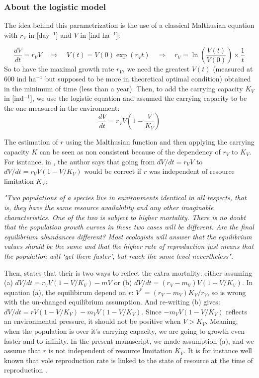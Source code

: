 \documentclass[11pt]{article}
\begin{document}
\subsubsection{About the logistic model}

The idea behind this parametrization is the use of a classical Malthusian equation with $r_V$ in [day$^{-1}$] and $V$ in [ind ha$^{-1}$]:

\begin{equation}
\frac{dV}{dt} = r_V V \quad \Rightarrow \quad
V(t) = V(0) \exp(r_V t) \quad \Rightarrow \quad
r_V = \ln\left( \frac{V(t)}{V(0)} \right) \times \frac{1}{t}
\end{equation}
So to have the maximal growth rate $r_V$, we need the greatest $V(t)$ (measured at 600 ind ha$^{-1}$ but supposed to be more in theoretical optimal condition) obtained in the minimum of time (less than a year). 
%
Then, to add the carrying capacity $K_V$ in [ind$^{-1}$], we use the logistic equation and assumed the carrying capacity to be the one measured in the environment:
\begin{equation}
\frac{dV}{dt} = r_V V \left( 1 - \frac{V}{K_V}\right)
\end{equation}


The estimation of $r$ using the Malthusian function and then applying the carrying capacity $K$ can be seen as non consistent because of the dependency of $r_V$ to $K_V$. 
%
For isntance, in \citet{Ginzburg1992}, the author says that going from $dV/dt = r_V V$ to $dV/dt = r_V V (1-V/K_V)$ would be correct if $r$ was independent of resource limitation $K_V$:

\textit{"Two populations  of a species live in environments  identical in all  respects, that is, they  have the same resource availability  and any  other imaginable characteristics. One of the two is subject to  higher mortality. There is no doubt  that the population growth curves in these two cases will be different. Are the final equilibrium abundances different? Most ecologists will answer that the equilibrium values should be the same and that the higher rate of reproduction just means that the population will ‘get there faster’, but reach the same level nevertheless".}


Then, \citet{Ginzburg1992} states that their is two ways to reflect the extra mortality: either assuming (a) $dV/dt = r_V V(1-V/K_V) - mV$ or (b) $dV/dt = (r_V-m_V)V(1-V/K_V)$.
%
In equation (a), the equilibirum depend on $r$: $V^* = (r_V-m_V) K_V /r_V$, so is wrong with the un-changed equilibrium assumption.
%
And re-writing (b) gives: $dV/dt = rV(1-V/K_V) - m_V V(1-V/K_V)$. Since $- m_V V(1-V/K_V)$ reflects an environmental pressure, it should not be positive when $V>K_V$. Meaning, when the population is over it’s carrying capacity, we are going to growth even faster and to infinity.
%
In the present manuscript, we made assumption (a), and we assume that $r$ is not independent of resource limitation $K_V$. It is for instance well known that vole reproduction rate is linked to the state of resource at the time of reproduction \citep{Pinot2016}.
\end{document}
